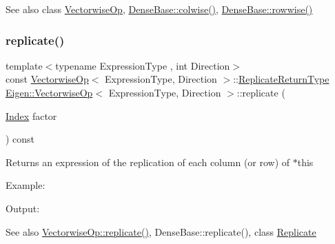 \begin{DoxySeeAlso}{See also}
class \mbox{\hyperlink{class_eigen_1_1_vectorwise_op}{Vectorwise\+Op}}, \mbox{\hyperlink{class_eigen_1_1_dense_base_a1c0e1b6067ec1de6cb8799da55aa7d30}{Dense\+Base\+::colwise()}}, \mbox{\hyperlink{class_eigen_1_1_dense_base_a6daa3a3156ca0e0722bf78638e1c7f28}{Dense\+Base\+::rowwise()}} 
\end{DoxySeeAlso}
\mbox{\label{class_eigen_1_1_vectorwise_op_a5f0c8dc9e9c4aeaa2057f15800f5c18c}} 
\subsubsection{\texorpdfstring{replicate()}{replicate()}\hspace{0.1cm}{\footnotesize\ttfamily [1/2]}}
{\footnotesize\ttfamily template$<$typename Expression\+Type , int Direction$>$ \\
const \mbox{\hyperlink{class_eigen_1_1_vectorwise_op}{Vectorwise\+Op}}$<$ Expression\+Type, Direction $>$\+::\mbox{\hyperlink{class_eigen_1_1_replicate}{Replicate\+Return\+Type}} \mbox{\hyperlink{class_eigen_1_1_vectorwise_op}{Eigen\+::\+Vectorwise\+Op}}$<$ Expression\+Type, Direction $>$\+::replicate (\begin{DoxyParamCaption}\item[{\mbox{\hyperlink{class_eigen_1_1_vectorwise_op_a4907c654e5810edd98e4162093b19532}{Index}}}]{factor }\end{DoxyParamCaption}) const}

\begin{DoxyReturn}{Returns}
an expression of the replication of each column (or row) of {\ttfamily $\ast$this} 
\end{DoxyReturn}
Example\+: 
\begin{DoxyCodeInclude}{0}
\end{DoxyCodeInclude}
 Output\+: 
\begin{DoxyVerbInclude}
\end{DoxyVerbInclude}


\begin{DoxySeeAlso}{See also}
\mbox{\hyperlink{class_eigen_1_1_vectorwise_op_a5f0c8dc9e9c4aeaa2057f15800f5c18c}{Vectorwise\+Op\+::replicate()}}, Dense\+Base\+::replicate(), class \mbox{\hyperlink{class_eigen_1_1_replicate}{Replicate}} 
\end{DoxySeeAlso}
\mbox{\label{class_eigen_1_1_vectorwise_op_adafbfe5f623bc8fdc9877eb073f1ba5c}} 
